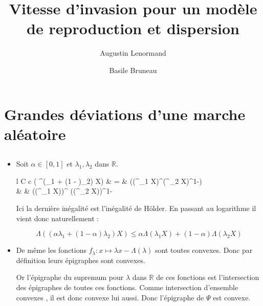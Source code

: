 \documentclass[12pt]{article}
\title{Vitesse d'invasion pour un modèle de reproduction et dispersion}
\author{Augustin Lenormand \and Basile Bruneau}
\renewcommand\labelitemi{\textbullet}
\newcommand{\esp}{\mathbb{E}}
\renewcommand{\exp}{\mathrm{e}^}
\begin{document}
	\maketitle

	\section{Grandes déviations d'une marche aléatoire}
		\subsection{} %
			
			\renewcommand\labelitemi{\textbullet}
			
			\begin{itemize}
	
				\item	Soit $\alpha\in [0,1]$ et $\lambda_1, \lambda_2$ dans $\mathbb{R}$.
	
						\begin{IEEEeqnarray*}{l C c}
							\esp( \exp{(\alpha \lambda_1 + (1 - \alpha)\lambda_2) X}) &     =     &  \esp((\exp{\lambda_1 X})^{\alpha}(\exp{\lambda_2 X})^{1-\alpha})\\
																   					  & \leqslant & (\esp(\exp{\lambda_1 X}))^{\alpha} (\esp(\exp{\lambda_2 X}))^{1- \alpha}
						\end{IEEEeqnarray*}
	
	
						Ici la dernière inégalité est l'inégalité de Hölder. En passant au logarithme il vient donc naturellement :	
	
						\begin{equation*}
							\Lambda((\alpha \lambda_1 + (1 - \alpha)\lambda_2) X) \leqslant \alpha \Lambda(\lambda_1 X) + (1-\alpha) \Lambda(\lambda_2 X)
						\end{equation*}
		
		
				\item	De même les fonctions $f_\lambda : x \mapsto \lambda x - \Lambda (\lambda)$ sont toutes convexes. Donc par définition leurs épigraphes sont convexes.
			
						Or l'épigraphe du supremum pour $\lambda$ dans $\mathbb{R}$ de ces fonctions est l'intersection des épigraphes de toutes ces fonctions. Comme intersection d'ensemble convexes , il est donc convexe lui aussi. Donc l'épigraphe de $\Psi$ est convexe.
		

\end{itemize}
\end{document}
